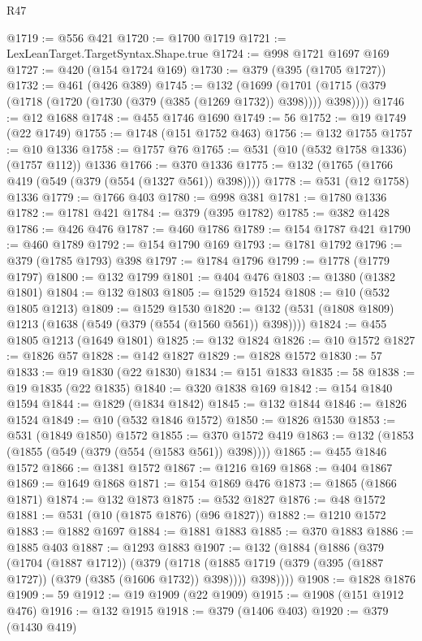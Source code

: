 \begin{lexlean}{R47}
\begin{coremodule}
@1719 := @556 @421
@1720 := @1700 @1719
@1721 := LexLeanTarget.TargetSyntax.Shape.true
@1724 := @998 @1721 @1697 @169
@1727 := @420 (@154 @1724 @169)
@1730 := @379 (@395 (@1705 @1727))
@1732 := @461 (@426 @389)
@1745 := @132
    (@1699 (@1701 (@1715 (@379 (@1718 (@1720 (@1730 (@379 (@385 (@1269 @1732)) @398)))) @398))))
@1746 := @12 @1688
@1748 := @455 @1746 @1690
@1749 := 56
@1752 := @19 @1749 (@22 @1749)
@1755 := @1748 (@151 @1752 @463)
@1756 := @132 @1755
@1757 := @10 @1336
@1758 := @1757 @76
@1765 := @531 (@10 (@532 @1758 @1336) (@1757 @112)) @1336
@1766 := @370 @1336
@1775 := @132 (@1765 (@1766 @419 (@549 (@379 (@554 (@1327 @561)) @398))))
@1778 := @531 (@12 @1758) @1336
@1779 := @1766 @403
@1780 := @998 @381
@1781 := @1780 @1336
@1782 := @1781 @421
@1784 := @379 (@395 @1782)
@1785 := @382 @1428
@1786 := @426 @476
@1787 := @460 @1786
@1789 := @154 @1787 @421
@1790 := @460 @1789
@1792 := @154 @1790 @169
@1793 := @1781 @1792
@1796 := @379 (@1785 @1793) @398
@1797 := @1784 @1796
@1799 := @1778 (@1779 @1797)
@1800 := @132 @1799
@1801 := @404 @476
@1803 := @1380 (@1382 @1801)
@1804 := @132 @1803
@1805 := @1529 @1524
@1808 := @10 (@532 @1805 @1213)
@1809 := @1529 @1530
@1820 := @132 (@531 (@1808 @1809) @1213 (@1638 (@549 (@379 (@554 (@1560 @561)) @398))))
@1824 := @455 @1805 @1213 (@1649 @1801)
@1825 := @132 @1824
@1826 := @10 @1572
@1827 := @1826 @57
@1828 := @142 @1827
@1829 := @1828 @1572
@1830 := 57
@1833 := @19 @1830 (@22 @1830)
@1834 := @151 @1833
@1835 := 58
@1838 := @19 @1835 (@22 @1835)
@1840 := @320 @1838 @169
@1842 := @154 @1840 @1594
@1844 := @1829 (@1834 @1842)
@1845 := @132 @1844
@1846 := @1826 @1524
@1849 := @10 (@532 @1846 @1572)
@1850 := @1826 @1530
@1853 := @531 (@1849 @1850) @1572
@1855 := @370 @1572 @419
@1863 := @132 (@1853 (@1855 (@549 (@379 (@554 (@1583 @561)) @398))))
@1865 := @455 @1846 @1572
@1866 := @1381 @1572
@1867 := @1216 @169
@1868 := @404 @1867
@1869 := @1649 @1868
@1871 := @154 @1869 @476
@1873 := @1865 (@1866 @1871)
@1874 := @132 @1873
@1875 := @532 @1827
@1876 := @48 @1572
@1881 := @531 (@10 (@1875 @1876) (@96 @1827))
@1882 := @1210 @1572
@1883 := @1882 @1697
@1884 := @1881 @1883
@1885 := @370 @1883
@1886 := @1885 @403
@1887 := @1293 @1883
@1907 := @132
    (@1884
      (@1886
        (@379
          (@1704 (@1887 @1712))
          (@379
            (@1718 (@1885 @1719 (@379 (@395 (@1887 @1727)) (@379 (@385 (@1606 @1732)) @398))))
            @398))))
@1908 := @1828 @1876
@1909 := 59
@1912 := @19 @1909 (@22 @1909)
@1915 := @1908 (@151 @1912 @476)
@1916 := @132 @1915
@1918 := @379 (@1406 @403)
@1920 := @379 (@1430 @419)

\end{coremodule}
\end{lexlean}
